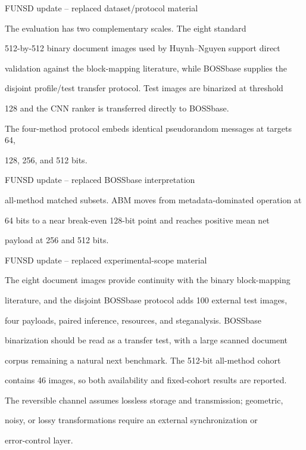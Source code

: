 \begin{RevisionDeletion}
FUNSD update -- replaced dataset/protocol material\par
The evaluation has two complementary scales. The eight standard\par
512-by-512 binary document images used by Huynh--Nguyen support direct\par
validation against the block-mapping literature, while BOSSbase supplies the\par
disjoint profile/test transfer protocol. Test images are binarized at threshold\par
128 and the CNN ranker is transferred directly to BOSSbase.\par
The four-method protocol embeds identical pseudorandom messages at targets 64,\par
128, 256, and 512 bits.\par
\end{RevisionDeletion}

\begin{RevisionDeletion}
FUNSD update -- replaced BOSSbase interpretation\par
all-method matched subsets. ABM moves from metadata-dominated operation at\par
64 bits to a near break-even 128-bit point and reaches positive mean net\par
payload at 256 and 512 bits.\par
\end{RevisionDeletion}

\begin{RevisionDeletion}
FUNSD update -- replaced experimental-scope material\par
The eight document images provide continuity with the binary block-mapping\par
literature, and the disjoint BOSSbase protocol adds 100 external test images,\par
four payloads, paired inference, resources, and steganalysis. BOSSbase\par
binarization should be read as a transfer test, with a large scanned document\par
corpus remaining a natural next benchmark. The 512-bit all-method cohort\par
contains 46 images, so both availability and fixed-cohort results are reported.\par
The reversible channel assumes lossless storage and transmission; geometric,\par
noisy, or lossy transformations require an external synchronization or\par
error-control layer.\par
\end{RevisionDeletion}

